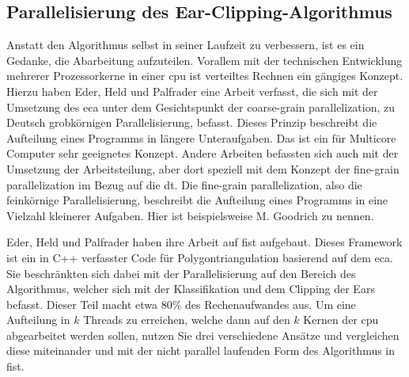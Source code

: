 \subsection{Parallelisierung des Ear-Clipping-Algorithmus}

Anstatt den Algorithmus selbst in seiner Laufzeit zu verbessern, ist es ein Gedanke, die Abarbeitung aufzuteilen. Vorallem mit der technischen Entwicklung mehrerer Prozessorkerne in einer \ac{cpu}
ist verteiltes Rechnen ein gängiges Konzept. Hierzu haben Eder, Held und Palfrader eine Arbeit verfasst, die sich mit der Umsetzung des \ac{eca} unter dem Gesichtspunkt der coarse-grain parallelization,
zu Deutsch grobkörnigen Parallelisierung, befasst.\cite{paralleleca} Dieses Prinzip beschreibt die Aufteilung eines Programms in längere Unteraufgaben. Das ist ein für Multicore Computer sehr geeignetes Konzept.
Andere Arbeiten befassten sich auch mit der Umsetzung der Arbeitsteilung, aber dort speziell mit dem Konzept der fine-grain parallelization im Bezug auf die \ac{dt}. Die fine-grain parallelization, also die feinkörnige 
Parallelisierung, beschreibt die Aufteilung eines Programms in eine Vielzahl kleinerer Aufgaben. 
Hier ist beispielsweise M. Goodrich\cite{goodrich} zu nennen.

Eder, Held und Palfrader haben ihre Arbeit auf \ac{fist} aufgebaut. Dieses Framework ist ein in C++ verfasster Code für Polygontriangulation basierend auf dem \ac{eca}.\cite{paralleleca}
Sie beschränkten sich dabei mit der Parallelisierung auf den Bereich des Algorithmus, welcher sich mit der Klassifikation und dem Clipping der Ears befasst. Dieser Teil macht etwa $80\%$ des Rechenaufwandes aus.
Um eine Aufteilung in $k$ Threads zu erreichen, welche dann auf den $k$ Kernen der \ac{cpu} abgearbeitet werden sollen, nutzen Sie drei verschiedene Ansätze und vergleichen diese miteinander und mit der nicht parallel 
laufenden Form des Algorithmus in \ac{fist}.

